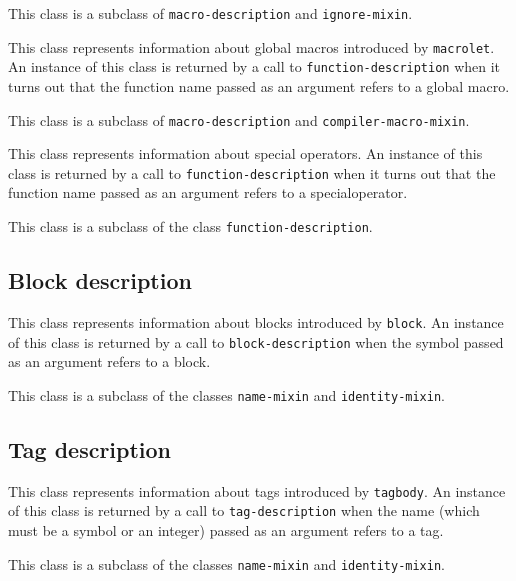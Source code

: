 This class is a subclass of \texttt{macro-description} and \texttt{ignore-mixin}.

{\footnotesize
{}
}

This class represents information about global macros introduced by
\texttt{macrolet}.  An instance of this class is returned by a call to
\texttt{function-description} when it turns out that the function name passed
as an argument refers to a global macro.

This class is a subclass of \texttt{macro-description} and
\texttt{compiler-macro-mixin}.

{\footnotesize
{}
}

This class represents information about special operators.  An
instance of this class is returned by a call to \texttt{function-description}
when it turns out that the function name passed as an argument refers
to a specialoperator.

This class is a subclass of the class \texttt{function-description}.

\subsection{Block description}
\label{sec-instantiable-classes-block-desciption}

{\footnotesize
{}
}

This class represents information about blocks introduced by
\texttt{block}.  An instance of this class is returned by a call to
\texttt{block-description} when the symbol passed as an argument refers to a
block.

This class is a subclass of the classes \texttt{name-mixin} and
\texttt{identity-mixin}.

\subsection{Tag description}
\label{sec-instantiable-classes-tag-desciption}

{\footnotesize
{}
}

This class represents information about tags introduced by
\texttt{tagbody}.  An instance of this class is returned by a call to
\texttt{tag-description} when the name (which must be a symbol or an integer)
passed as an argument refers to a tag.

This class is a subclass of the classes \texttt{name-mixin} and
\texttt{identity-mixin}.

